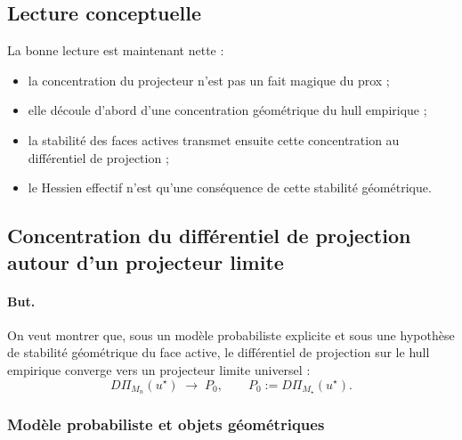\subsection{Lecture conceptuelle}

La bonne lecture est maintenant nette :

\begin{itemize}
    \item la concentration du projecteur n'est pas un fait magique du prox ;
    \item elle découle d'abord d'une concentration géométrique du hull empirique ;
    \item la stabilité des faces actives transmet ensuite cette concentration au différentiel de projection ;
    \item le Hessien effectif n'est qu'une conséquence de cette stabilité géométrique.
\end{itemize}




\subsection{Concentration du différentiel de projection autour d'un projecteur limite}
\label{subsec:projection_diff_concentration}

\paragraph{But.}
On veut montrer que, sous un modèle probabiliste explicite et sous une hypothèse de stabilité géométrique du face active, le différentiel de projection sur le hull empirique converge vers un projecteur limite universel :
\[
D\Pi_{M_n}(u^\star)\;\longrightarrow\;P_0,
\qquad
P_0:=D\Pi_{M_\star}(u^\star).
\]

\subsubsection{Modèle probabiliste et objets géométriques}


